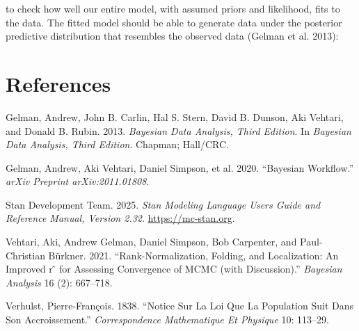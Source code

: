 \documentclass[
  12pt,
]{article}
\newlength{\cslhangindent}
\newenvironment{CSLReferences}[2] %
 {\begin{list}{}{%
  \setlength{\itemindent}{0pt}
  \setlength{\leftmargin}{0pt}
  \setlength{\parsep}{0pt}
  \ifodd #1
   \setlength{\leftmargin}{\cslhangindent}
   \setlength{\itemindent}{-1\cslhangindent}
  \fi
  \setlength{\itemsep}{#2\baselineskip}}}
 {\end{list}}
\begin{document}
to check how well our entire model, with assumed priors and likelihood,
fits to the data. The fitted model should be able to generate data under
the posterior predictive distribution that resembles the observed data
(Gelman et al. 2013):

\section*{References}\label{references}

\protect{}\label{refs}
\begin{CSLReferences}{1}{1}
Gelman, Andrew, John B. Carlin, Hal S. Stern, David B. Dunson, Aki
Vehtari, and Donald B. Rubin. 2013. \emph{Bayesian Data Analysis, Third
Edition}. In \emph{Bayesian Data Analysis, Third Edition}. Chapman;
Hall/CRC.

Gelman, Andrew, Aki Vehtari, Daniel Simpson, et al. 2020. {``Bayesian
Workflow.''} \emph{arXiv Preprint arXiv:2011.01808}.

Stan Development Team. 2025. \emph{Stan Modeling Language Users Guide
and Reference Manual, Version 2.32}. \url{https://mc-stan.org}.

Vehtari, Aki, Andrew Gelman, Daniel Simpson, Bob Carpenter, and
Paul-Christian Bürkner. 2021. {``Rank-Normalization, Folding, and
Localization: An Improved r ̂ for Assessing Convergence of MCMC (with
Discussion).''} \emph{Bayesian Analysis} 16 (2): 667--718.

Verhulst, Pierre-François. 1838. {``Notice Sur La Loi Que La Population
Suit Dans Son Accroissement.''} \emph{Correspondence Mathematique Et
Physique} 10: 113--29.

\end{CSLReferences}
\end{document}
